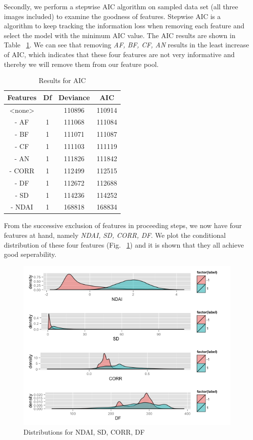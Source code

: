 \documentclass[english]{article}\usepackage{graphicx, color}
\numberwithin{equation}{section}
\numberwithin{figure}{section}
\begin{document}
Secondly, we perform a stepwise AIC algorithm on sampled data set (all three 
images included) to examine the goodness of features. Stepwise AIC is a 
algorithm to keep tracking the information loss when removing each feature 
and select the model with the minimum AIC value. The AIC results are shown 
in Table ~\ref{tab:PermTest}. We can see that removing \textit{AF, BF, CF, AN} 
results in the least increase of AIC, which indicates that these four features 
are not very informative and thereby we will remove them from our feature pool.
\begin{table}[!h]
\centering
\begin{tabular}{*{4}{c}}
Features & Df & Deviance & AIC\\
       \hline
<none>   &    & 110896   & 110914\\
- AF     & 1  & 111068   & 111084\\
- BF     & 1  & 111071   & 111087\\
- CF     & 1  & 111103   & 111119\\
- AN     & 1  & 111826   & 111842\\
- CORR   & 1  & 112499   & 112515\\
- DF     & 1  & 112672   & 112688\\
- SD     & 1  & 114236   & 114252\\
- NDAI   & 1  & 168818   & 168834\\
\end{tabular}
\caption{Results for AIC}
\label{tab:PermTest}
\end{table}

From the successive exclusion of features in proceeding steps, we now have 
four features at hand, namely \textit{NDAI, SD, CORR, DF}. We plot the 
conditional distribution of these four features (Fig. ~\ref{fig:CD}) and it is 
shown that they all achieve good seperability.

\begin{figure}[!h]
  \begin{center}
    \includegraphics[width=\columnwidth]{../figures/ConditionalDistribution.png}
  \end{center}
  \caption{Distributions for NDAI, SD, CORR, DF}
  \label{fig:CD}
\end{figure}
\end{document}
